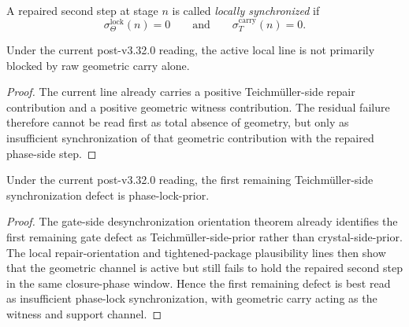 \begin{definition}
\label{def:locally-synchronized-repaired-second-step}
A repaired second step at stage $n$ is called \emph{locally synchronized} if
\[
  \sigma_{\Theta}^{\mathrm{lock}}(n)=0
  \qquad\text{and}\qquad
  \sigma_T^{\mathrm{carry}}(n)=0.
\]
\end{definition}

\begin{proposition}
\label{prop:current-line-is-not-raw-geometry-prior}
Under the current post-v3.32.0 reading, the active local line is not primarily blocked by raw geometric carry alone.
\end{proposition}

\begin{proof}
The current line already carries a positive Teichm\"uller-side repair contribution and a positive geometric witness contribution. The residual failure therefore cannot be read first as total absence of geometry, but only as insufficient synchronization of that geometric contribution with the repaired phase-side step.
\end{proof}

\begin{proposition}
\label{prop:current-line-is-phase-lock-prior-on-the-teichmueller-side}
Under the current post-v3.32.0 reading, the first remaining Teichm\"uller-side synchronization defect is phase-lock-prior.
\end{proposition}

\begin{proof}
The gate-side desynchronization orientation theorem already identifies the first remaining gate defect as Teichm\"uller-side-prior rather than crystal-side-prior. The local repair-orientation and tightened-package plausibility lines then show that the geometric channel is active but still fails to hold the repaired second step in the same closure-phase window. Hence the first remaining defect is best read as insufficient phase-lock synchronization, with geometric carry acting as the witness and support channel.
\end{proof}

